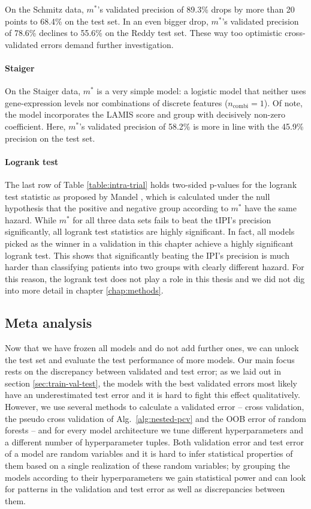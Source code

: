 On the Schmitz data, $m^*$'s validated precision of \num{89.3}\% drops by more than \num{20} points 
to \num{68.4}\% on the test set. In an even bigger drop, $m^*$'s validated precision of \num{78.6}\% 
declines to \num{55.6}\% on the Reddy test set. These way too optimistic cross-validated errors 
demand further investigation.

\paragraph{Staiger}
On the Staiger data, $m^*$ is a very simple model: a logistic model that neither uses 
gene-expression levels nor combinations of discrete features ($n_\text{combi} = 1$). Of note, the 
model incorporates the LAMIS score and group with decisively non-zero coefficient. Here, $m^*$'s 
validated precision of \num{58.2}\% is more in line with the \num{45.9}\% precision on the test set.

\paragraph{Logrank test}
The last row of Table \ref{table:intra-trial} holds two-sided p-values for the logrank test
statistic as proposed by Mandel \cite{mantel66}, which is calculated under the null hypothesis 
that the positive and negative group according to $m^*$ have the same hazard. While $m^*$ for all 
three data sets fails to beat the tIPI's precision significantly, all logrank test statistics are 
highly significant. In fact, all models picked as the winner in a validation in this chapter 
achieve a highly significant logrank test. This shows that significantly beating the 
IPI's precision is much harder than classifying patients into two groups with clearly different 
hazard. For this reason, the logrank test does not play a role in this thesis and we did not dig 
into more detail in chapter \ref{chap:methods}.

\subsection{Meta analysis}

Now that we have frozen all models and do not add further ones, we can unlock the test set and 
evaluate the test performance of more models. Our main focus rests on the discrepancy between 
validated and test error; as we laid out in section \ref{sec:train-val-test}, the models with the 
best validated errors most likely have an underestimated test error and it is hard to fight this 
effect qualitatively. However, we use several methods to calculate a validated error -- cross 
validation, the pseudo cross validation of Alg.\ \ref{alg:nested-pcv} and the OOB error of random 
forests -- and for every model architecture we tune different hyperparameters and a different 
number of hyperparameter tuples. Both validation error and test error of a model are random 
variables and it is hard to infer statistical properties of them based on a single realization of 
these random variables; by grouping the models according to their hyperparameters we gain 
statistical power and can look for patterns in the validation and test error as well as 
discrepancies between them.

